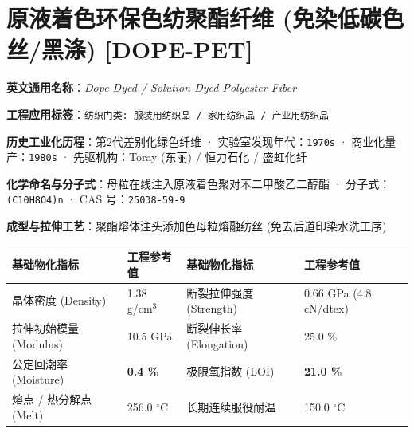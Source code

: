 \documentclass[11pt,openright,twoside,UTF8]{ctexbook}
\begin{document}
\section{原液着色环保色纺聚酯纤维 (免染低碳色丝/黑涤) [DOPE-PET]}
\label{sec:dope-pet}

\noindent\textbf{英文通用名称}：\textit{Dope Dyed / Solution Dyed Polyester Fiber}\par
\noindent\textbf{工程应用标签}：\texttt{纺织门类: 服装用纺织品 / 家用纺织品 / 产业用纺织品}\par
\noindent\textbf{历史工业化历程}：第2代差别化绿色纤维 · 实验室发现年代：\texttt{1970s} · 商业化量产：\texttt{1980s} · 先驱机构：Toray (东丽) / 恒力石化 / 盛虹化纤\par
\noindent\textbf{化学命名与分子式}：母粒在线注入原液着色聚对苯二甲酸乙二醇酯 · 分子式：\texttt{(C10H8O4)n} · CAS 号：\texttt{25038-59-9}\par
\noindent\textbf{成型与拉伸工艺}：聚酯熔体注头添加色母粒熔融纺丝 (免去后道印染水洗工序)\par

\vspace{0.15cm}
\begin{center}
\small
\begin{tabularx}{\textwidth}{p{3.8cm}Xp{3.8cm}X}
\toprule
\textbf{基础物化指标} & \textbf{工程参考值} & \textbf{基础物化指标} & \textbf{工程参考值} \\
\midrule
晶体密度 (Density) & 1.38 g/cm$^3$ & 断裂拉伸强度 (Strength) & 0.66 GPa (4.8 cN/dtex) \\
拉伸初始模量 (Modulus) & 10.5 GPa & 断裂伸长率 (Elongation) & 25.0 \% \\
公定回潮率 (Moisture) & \textbf{0.4 \%} & 极限氧指数 (LOI) & \textbf{21.0 \%} \\
熔点 / 热分解点 (Melt) & 256.0 $^\circ\mathrm{C}$ & 长期连续服役耐温 & 150.0 $^\circ\mathrm{C}$ \\
\bottomrule
\end{tabularx}
\end{center}
\vspace{0.15cm}
\end{document}
